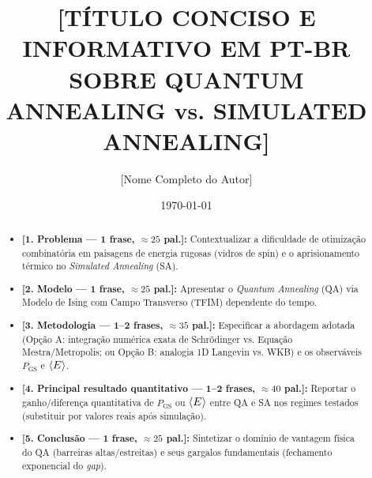 \documentclass[aps,pre,twocolumn,10pt,superscriptaddress,nofootinbib]{revtex4-2}
\begin{document}
\title{[TÍTULO CONCISO E INFORMATIVO EM PT-BR SOBRE QUANTUM ANNEALING vs. SIMULATED ANNEALING]}

\author{[Nome Completo do Autor]}

\date{\today}

\begin{abstract}
\begin{itemize}
  \item \textbf{[1. Problema --- 1 frase, $\approx 25$ pal.]:} Contextualizar a dificuldade de otimização combinatória em paisagens de energia rugosas (vidros de spin) e o aprisionamento térmico no \emph{Simulated Annealing} (SA).
  \item \textbf{[2. Modelo --- 1 frase, $\approx 25$ pal.]:} Apresentar o \emph{Quantum Annealing} (QA) via Modelo de Ising com Campo Transverso (TFIM) dependente do tempo.
  \item \textbf{[3. Metodologia --- 1--2 frases, $\approx 35$ pal.]:} Especificar a abordagem adotada (Opção A: integração numérica exata de Schrödinger vs. Equação Mestra/Metropolis; ou Opção B: analogia 1D Langevin vs. WKB) e os observáveis $P_{\text{GS}}$ e $\ev{E}$.
  \item \textbf{[4. Principal resultado quantitativo --- 1--2 frases, $\approx 40$ pal.]:} Reportar o ganho/diferença quantitativa de $P_{\text{GS}}$ ou $\ev{E}$ entre QA e SA nos regimes testados (substituir por valores reais após simulação).
  \item \textbf{[5. Conclusão --- 1 frase, $\approx 25$ pal.]:} Sintetizar o domínio de vantagem física do QA (barreiras altas/estreitas) e seus gargalos fundamentais (fechamento exponencial do \emph{gap}).
\end{itemize}
\end{abstract}

\maketitle
\end{document}
